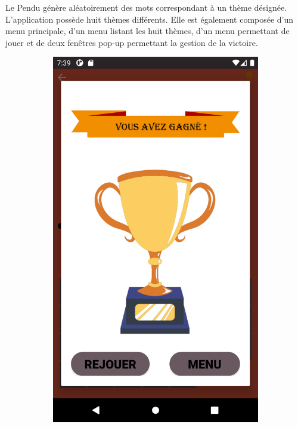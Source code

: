 \documentclass{article}
\begin{document}
Le Pendu génère aléatoirement des mots correspondant à un thème désignée. L'application possède huit thèmes différents. Elle est également composée d'un menu principale, d'un menu listant les huit thèmes, d'un menu permettant de jouer et de deux fenêtres pop-up permettant la gestion de la victoire.
\begin{figure}[!h]
    \centering
    \begin{subfigure}{}
        \includegraphics[scale=0.06]{victoire.png}
    \end{subfigure}

\end{figure}
\end{document}
